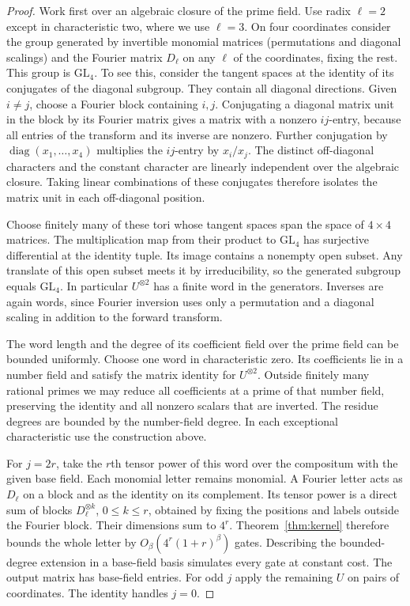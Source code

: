 \begin{proof}
Work first over an algebraic closure of the prime field. Use radix
\(\ell=2\) except in characteristic two, where we use \(\ell=3\).
On four coordinates consider the group generated by invertible
monomial matrices (permutations and diagonal scalings) and the Fourier
matrix \(D_\ell\) on any \(\ell\) of the coordinates, fixing the rest.
This group is \(\mathrm{GL}_4\). To see this, consider the tangent
spaces at the identity of its conjugates of the diagonal subgroup.
They contain all diagonal directions. Given \(i\ne j\), choose a
Fourier block containing \(i,j\). Conjugating a diagonal matrix unit
in the block by its Fourier matrix gives a matrix with a nonzero
\(ij\)-entry, because all entries of the transform and its inverse are
nonzero. Further conjugation by \(\operatorname{diag}(x_1,\ldots,x_4)\)
multiplies the \(ij\)-entry by \(x_i/x_j\). The distinct off-diagonal
characters and the constant character are linearly independent over
the algebraic closure. Taking linear combinations of these conjugates therefore isolates
the matrix unit in each off-diagonal position.

Choose finitely many of these tori whose tangent spaces span the space of
\(4\times4\) matrices. The multiplication map from their product to
\(\mathrm{GL}_4\) has surjective differential at the identity tuple.
Its image contains a nonempty open subset. Any translate of this open
subset meets it by irreducibility, so the generated subgroup equals
\(\mathrm{GL}_4\). In particular \(U^{\otimes2}\) has a finite word
in the generators. Inverses are again words, since Fourier inversion
uses only a permutation and a diagonal scaling in addition to the
forward transform.

The word length and the degree of its coefficient field over the prime
field can be bounded uniformly. Choose one word in characteristic zero.
Its coefficients lie in a number field and satisfy the matrix identity
for \(U^{\otimes2}\). Outside finitely many rational primes we may
reduce all coefficients at a prime of that number field, preserving
the identity and all nonzero scalars that are inverted. The residue
degrees are bounded by the number-field degree. In each exceptional
characteristic use the construction above.

For \(j=2r\), take the \(r\)th tensor power of this word over the
compositum with the given base field. Each monomial letter remains
monomial. A Fourier letter acts as \(D_\ell\) on a block and as the
identity on its complement. Its tensor power is a direct sum of
blocks \(D_\ell^{\otimes k}\), \(0\le k\le r\), obtained by fixing
the positions and labels outside the Fourier block. Their dimensions
sum to \(4^r\). Theorem~\ref{thm:kernel} therefore bounds the whole
letter by \(O_\beta(4^r(1+r)^\beta)\) gates. Describing the bounded-degree
extension in a base-field basis simulates every gate at constant cost.
The output matrix has base-field entries. For odd \(j\) apply the
remaining \(U\) on pairs of coordinates. The identity handles \(j=0\).
\end{proof}

